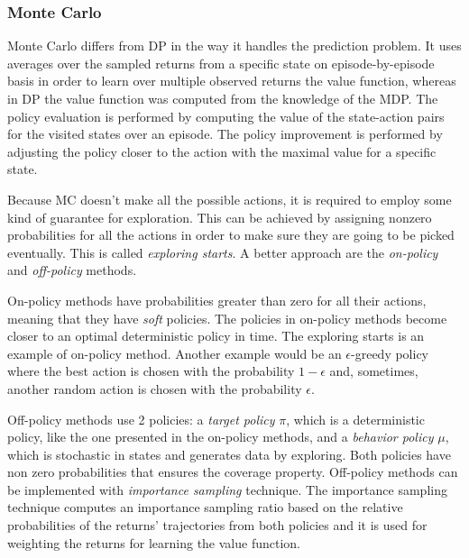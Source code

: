 \subsubsection{Monte Carlo}
Monte Carlo differs from DP in the way it handles the prediction problem. It uses averages over the sampled returns from a specific state on episode-by-episode basis in order to learn over multiple observed returns the value function, whereas in DP the value function was computed from the knowledge of the MDP. The policy evaluation is performed by computing the value of the state-action pairs for the visited states over an episode. The policy improvement is performed by adjusting the policy closer to the action with the maximal value for a specific state.

Because MC doesn't make all the possible actions, it is required to employ some kind of guarantee for exploration. This can be achieved by assigning nonzero probabilities for all the actions in order to make sure they are going to be picked eventually. This is called \textit{exploring starts}. A better approach are the \textit{on-policy} and \textit{off-policy} methods. 

On-policy methods have probabilities greater than zero for all their actions, meaning that they have \textit{soft} policies. The policies in on-policy methods become closer to an optimal deterministic policy in time. The exploring starts is an example of on-policy method. Another example would be an $\epsilon$-greedy policy where the best action is chosen with the probability $1-\epsilon$ and, sometimes, another random action is chosen with the probability $\epsilon$.

Off-policy methods use 2 policies: a \textit{target policy} $\pi$, which is a deterministic policy, like the one presented in the on-policy methods, and a \textit{behavior policy} $\mu$, which is stochastic in states and generates data by exploring. Both policies have non zero probabilities that ensures the coverage property. Off-policy methods can be implemented with \textit{importance sampling} technique. The importance sampling technique computes an importance sampling ratio based on the relative probabilities of the returns' trajectories from both policies and it is used for weighting the returns for learning the value function.

